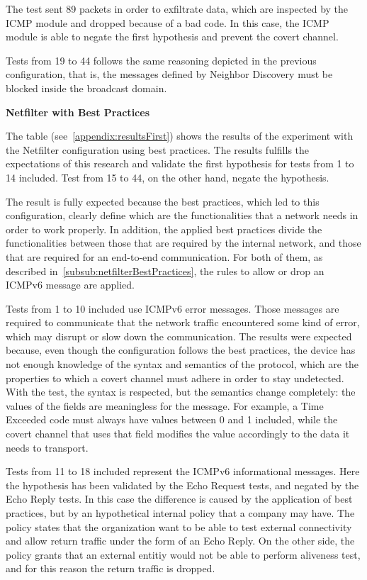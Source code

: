 \documentclass[12pt]{article}
\begin{document}
The test sent 89 packets in order to exfiltrate data, which are inspected by the ICMP module and dropped because of a bad code. In this case, the ICMP module is able to negate the first hypothesis and prevent the covert channel.

Tests from 19 to 44 follows the same reasoning depicted in the previous configuration, that is, the messages defined by Neighbor Discovery must be blocked inside the broadcast domain. 


\textbf{Netfilter with Best Practices}
\label{resultsFirstNetfilterBest}

The table (see~\ref{appendix:resultsFirst}) shows the results of the experiment with the Netfilter configuration using best practices. The results fulfills the expectations of this research and validate the first hypothesis for tests from 1 to 14 included. Test from 15 to 44, on the other hand, negate the hypothesis.

The result is fully expected because the best practices, which led to this configuration, clearly define which are the functionalities that a network needs in order to work properly. In addition, the applied best practices divide the functionalities between those that are required by the internal network, and those that are required for an end-to-end communication. For both of them, as described in~\ref{subsub:netfilterBestPractices}, the rules to allow or drop an ICMPv6 message are applied.

Tests from 1 to 10 included use ICMPv6 error messages. Those messages are required to communicate that the network traffic encountered some kind of error, which may disrupt or slow down the communication. The results  were expected because, even though the configuration follows the best practices, the device has not enough knowledge of the syntax and semantics of the protocol, which are the properties to which a covert channel must adhere in order to stay undetected. With the test, the syntax is respected, but the semantics change completely: the values of the fields are meaningless for the message. For example, a Time Exceeded code must always have values between 0 and 1 included, while the covert channel that uses that field modifies the value accordingly to the data it needs to transport.

Tests from 11 to 18 included represent the ICMPv6 informational messages. Here the hypothesis has been validated by the Echo Request tests, and negated by the Echo Reply tests. In this case the difference is caused by the application of best practices, but by an hypothetical internal policy that a company may have. The policy states that the organization want to be able to test external connectivity and allow return traffic under the form of an Echo Reply. On the other side, the policy grants that an external entitiy would not be able to perform aliveness test, and for this reason the return traffic is dropped.
\end{document}
